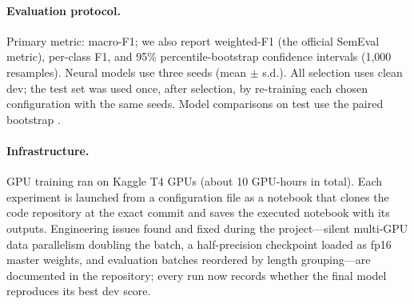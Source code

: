 \documentclass[11pt]{article}
\begin{document}
\paragraph{Evaluation protocol.} Primary metric: macro-F1; we also report weighted-F1 (the official SemEval metric), per-class F1, and 95\% percentile-bootstrap confidence intervals (1,000 resamples). Neural models use three seeds (mean $\pm$ s.d.). All selection uses clean dev; the test set was used once, after selection, by re-training each chosen configuration with the same seeds. Model comparisons on test use the paired bootstrap \citep{koehn-2004-statistical}.

\paragraph{Infrastructure.} GPU training ran on Kaggle T4 GPUs (about 10 GPU-hours in total). Each experiment is launched from a configuration file as a notebook that clones the code repository at the exact commit and saves the executed notebook with its outputs. Engineering issues found and fixed during the project---silent multi-GPU data parallelism doubling the batch, a half-precision checkpoint loaded as fp16 master weights, and evaluation batches reordered by length grouping---are documented in the repository; every run now records whether the final model reproduces its best dev score.
\end{document}
